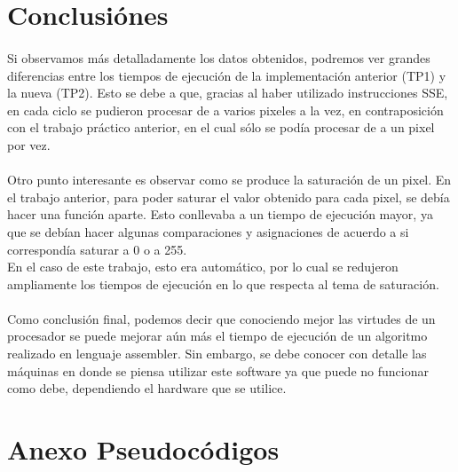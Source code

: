 \documentclass[11pt, a4paper]{article}
\begin{document}
\newpage
\section{Conclusi\'ones}
\paragraph{}
Si observamos m\'as detalladamente los datos obtenidos, podremos ver grandes diferencias entre los tiempos de ejecuci\'on de la implementaci\'on anterior (TP1) y la nueva (TP2). Esto se debe a que, gracias al haber utilizado instrucciones SSE, en cada ciclo se pudieron procesar de a varios pixeles a la vez, en contraposici\'on con el trabajo pr\'actico anterior, en el cual s\'olo se pod\'ia procesar de a un pixel por vez.

\paragraph{}
Otro punto interesante es observar como se produce la saturaci\'on de un pixel. En el trabajo anterior, para poder saturar el valor obtenido para cada pixel, se deb\'ia hacer una funci\'on aparte. Esto conllevaba a un tiempo de ejecuci\'on mayor, ya que se deb\'ian hacer algunas comparaciones y asignaciones de acuerdo a si correspond\'ia saturar a 0 o a 255.\\
En el caso de este trabajo, esto era autom\'atico, por lo cual se redujeron ampliamente los tiempos de ejecuci\'on en lo que respecta al tema de saturaci\'on. 

\paragraph{}
Como conclusi\'on final, podemos decir que conociendo mejor las virtudes de un procesador se puede mejorar a\'un m\'as el tiempo de ejecuci\'on de un algoritmo realizado en lenguaje assembler. Sin embargo, se debe conocer con detalle las m\'aquinas en donde se piensa utilizar este software ya que puede no funcionar como debe, dependiendo el hardware que se utilice.


\newpage
\section{Anexo Pseudoc\'odigos}

 
    \incmargin{1em}
    \linesnumbered
    \dontprintsemicolon
    
\end{document}
